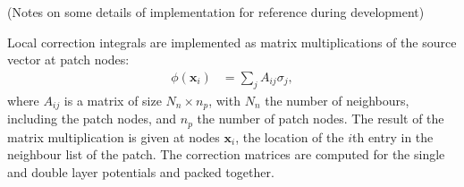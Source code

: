 \documentclass[a4paper,12pt]{article}
\begin{document}
(Notes on some details of implementation for reference during development)


Local correction integrals are implemented as matrix multiplications
of the source vector at patch nodes:
\begin{align}
  \phi(\mathbf{x}_{i})
  &=
  \sum_{j} A_{ij}\sigma_{j},
\end{align}
where $A_{ij}$ is a matrix of size $N_{n}\times n_{p}$, with $N_{n}$
the number of neighbours, including the patch nodes, and $n_{p}$ the
number of patch nodes. The result of the matrix multiplication is
given at nodes $\mathbf{x}_{i}$, the location of the $i$th entry in
the neighbour list of the patch. The correction matrices are computed
for the single and double layer potentials and packed together. 
\end{document}
